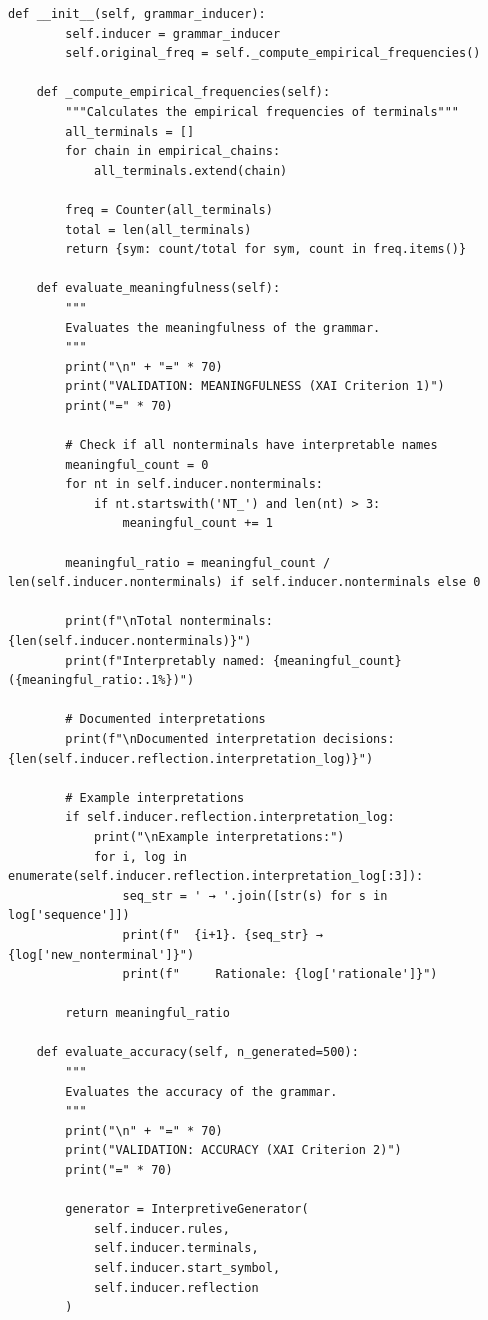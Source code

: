 \documentclass[
  12pt,
  a4paper,
  oneside,
  titlepage
]{article}
\begin{document}
\begin{lstlisting}[caption=Algorithmic Recursive Sequence Analysis 3.0 - Hierarchical Grammar Induction]
    def __init__(self, grammar_inducer):
        self.inducer = grammar_inducer
        self.original_freq = self._compute_empirical_frequencies()
        
    def _compute_empirical_frequencies(self):
        """Calculates the empirical frequencies of terminals"""
        all_terminals = []
        for chain in empirical_chains:
            all_terminals.extend(chain)
        
        freq = Counter(all_terminals)
        total = len(all_terminals)
        return {sym: count/total for sym, count in freq.items()}
    
    def evaluate_meaningfulness(self):
        """
        Evaluates the meaningfulness of the grammar.
        """
        print("\n" + "=" * 70)
        print("VALIDATION: MEANINGFULNESS (XAI Criterion 1)")
        print("=" * 70)
        
        # Check if all nonterminals have interpretable names
        meaningful_count = 0
        for nt in self.inducer.nonterminals:
            if nt.startswith('NT_') and len(nt) > 3:
                meaningful_count += 1
        
        meaningful_ratio = meaningful_count / len(self.inducer.nonterminals) if self.inducer.nonterminals else 0
        
        print(f"\nTotal nonterminals: {len(self.inducer.nonterminals)}")
        print(f"Interpretably named: {meaningful_count} ({meaningful_ratio:.1%})")
        
        # Documented interpretations
        print(f"\nDocumented interpretation decisions: {len(self.inducer.reflection.interpretation_log)}")
        
        # Example interpretations
        if self.inducer.reflection.interpretation_log:
            print("\nExample interpretations:")
            for i, log in enumerate(self.inducer.reflection.interpretation_log[:3]):
                seq_str = ' → '.join([str(s) for s in log['sequence']])
                print(f"  {i+1}. {seq_str} → {log['new_nonterminal']}")
                print(f"     Rationale: {log['rationale']}")
        
        return meaningful_ratio
    
    def evaluate_accuracy(self, n_generated=500):
        """
        Evaluates the accuracy of the grammar.
        """
        print("\n" + "=" * 70)
        print("VALIDATION: ACCURACY (XAI Criterion 2)")
        print("=" * 70)
        
        generator = InterpretiveGenerator(
            self.inducer.rules, 
            self.inducer.terminals, 
            self.inducer.start_symbol,
            self.inducer.reflection
        )
        

\end{lstlisting}
\end{document}
